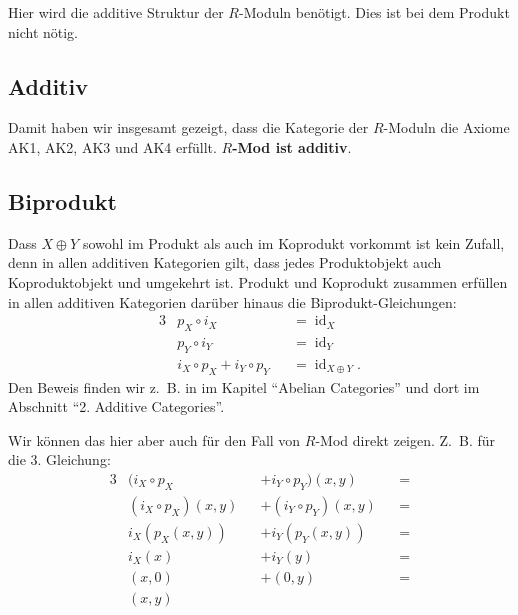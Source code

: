 \documentclass[a4paper]{amsart}
\theoremstyle{definition}
\DeclareMathOperator{\id}{id}
\newcommand{\zb}{z.~B. }
\begin{document}
{\color{red} Hier wird die additive Struktur der $R$-Moduln benötigt. Dies ist bei dem Produkt nicht nötig.}

\subsection{Additiv}
Damit haben wir insgesamt gezeigt, dass die Kategorie der $R$-Moduln die Axiome AK1, AK2, AK3 und AK4 erfüllt. \textbf{$R$-Mod ist additiv}.

\subsection{Biprodukt}
Dass $X \oplus Y$ sowohl im Produkt als auch im Koprodukt vorkommt ist kein Zufall, denn in allen additiven Kategorien gilt, dass jedes Produktobjekt auch Koproduktobjekt und umgekehrt ist. Produkt und Koprodukt zusammen erfüllen in allen additiven Kategorien darüber hinaus die Biprodukt-Gleichungen:
\begin{alignat}{3}
   &p_X \circ i_X &&= \id_X\\
   &p_Y \circ i_Y &&= \id_Y\\
   &i_X \circ p_X + i_Y \circ p_Y &&= \id_{X \oplus Y}.
\end{alignat}
Den Beweis finden wir \zb in \cite{MacLane} im Kapitel "`Abelian Categories"' und dort im Abschnitt "`2. Additive Categories"'.

Wir können das hier aber auch für den Fall von $R$-Mod direkt zeigen. Z.~B. für die 3. Gleichung:
\begin{alignat}{3}
   &(i_X \circ p_X &&+ i_Y \circ p_Y)(x,y) &&=\\ 
   &(i_X \circ p_X)(x,y) &&+ (i_Y \circ p_Y)(x,y) &&=\\ 
   &i_X( p_X(x,y) ) &&+ i_Y( p_Y(x,y)) &&=\\ 
   &i_X(x)  &&+ i_Y(y) &&=\\ 
   &( x,0)  &&+ ( 0,y) &&=\\ 
   &(x,y)
\end{alignat}
\end{document}
